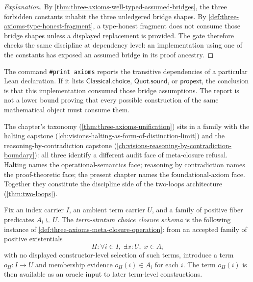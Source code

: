 \begin{proof}[Explanation]
By \autoref{thm:three-axioms-well-typed-assumed-bridges}, the three forbidden
constants inhabit the three unledgered bridge shapes. By
\autoref{def:three-axioms-type-honest-fragment}, a type-honest fragment
does not consume those bridge shapes unless a displayed replacement is
provided. The gate therefore checks the same discipline at dependency level:
an implementation using one of the constants has exposed an assumed bridge in
its proof ancestry.
\end{proof}

\begin{remark}
\label{rem:three-axioms-print-axioms-footprint}
The command \texttt{\#print axioms} reports the transitive dependencies of a
particular Lean declaration. If it lists $\mathsf{Classical.choice}$,
$\mathsf{Quot.sound}$, or $\mathsf{propext}$, the conclusion is that this
implementation consumed those bridge assumptions. The report is not a lower
bound proving that every possible construction of the same mathematical
object must consume them.
\end{remark}

\begin{remark}
\label{rem:three-axioms-siblings}
The chapter's taxonomy (\autoref{thm:three-axioms-unification}) sits in a family with the halting capstone (\autoref{ch:visions-halting-as-form-of-distinction-limit}) and the reasoning-by-contradiction capstone (\autoref{ch:visions-reasoning-by-contradiction-boundary}): all three identify a different audit face of meta-closure refusal. Halting names the operational-semantics face; reasoning by contradiction names the proof-theoretic face; the present chapter names the foundational-axiom face. Together they constitute the discipline side of the two-loops architecture (\autoref{thm:two-loops}).
\end{remark}

\begin{definition}
\label{def:term-stratum-choice-closure}
Fix an index carrier $I$, an ambient term carrier $U$, and a family of positive fiber predicates $A_i \subseteq U$. The \emph{term-stratum choice closure schema} is the following instance of \autoref{def:three-axioms-meta-closure-operation}: from an accepted family of positive existentials
$$
H:\forall i \in I,\; \exists x:U,\; x \in A_i
$$
with no displayed constructor-level selection of such terms, introduce a term $o_H:I\to U$ and membership evidence $o_H(i)\in A_i$ for each $i$. The term $o_H(i)$ is then available as an oracle input to later term-level constructions.
\end{definition}

